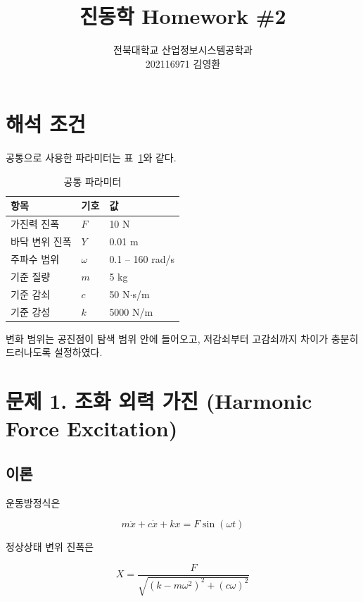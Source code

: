\documentclass[12pt, a4paper]{article}
\title{\Large 진동학 Homework \#2}
\author{
  전북대학교 산업정보시스템공학과 \\
  202116971 \; 김영환
}
\date{}
\begin{document}
\maketitle
\tableofcontents
\newpage

\section{해석 조건}

공통으로 사용한 파라미터는 표~\ref{tab:params}와 같다.

\begin{table}[H]
\centering
\caption{공통 파라미터}
\label{tab:params}
\begin{tabular}{lll}
\toprule
항목 & 기호 & 값 \\
\midrule
가진력 진폭       & $F$      & 10 N \\
바닥 변위 진폭    & $Y$      & 0.01 m \\
주파수 범위       & $\omega$ & 0.1 -- 160 rad/s \\
기준 질량         & $m$      & 5 kg \\
기준 감쇠         & $c$      & 50 N$\cdot$s/m \\
기준 강성         & $k$      & 5000 N/m \\
\bottomrule
\end{tabular}
\end{table}

변화 범위는 공진점이 탐색 범위 안에 들어오고, 저감쇠부터 고감쇠까지 차이가 충분히 드러나도록 설정하였다.

\section{문제 1. 조화 외력 가진 (Harmonic Force Excitation)}

\subsection{이론}

운동방정식은

\begin{equation}
  m\ddot{x} + c\dot{x} + kx = F\sin(\omega t)
\end{equation}

정상상태 변위 진폭은

\begin{equation}
  X = \frac{F}{\sqrt{(k - m\omega^2)^2 + (c\omega)^2}}
  \label{eq:p1}
\end{equation}
\end{document}
